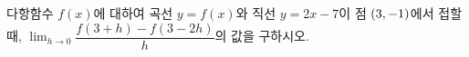 다항함수 $f(x)$에 대하여 곡선 $y=f(x)$와 직선 $y=2x-7$이 점 $(3{,}\mkern3mu\mathopen{}-1)$에서 접할 때, $\displaystyle\lim_{h\to 0}\dfrac{f(3+h)-f(3-2h)}{h}$의 값을 구하시오.
